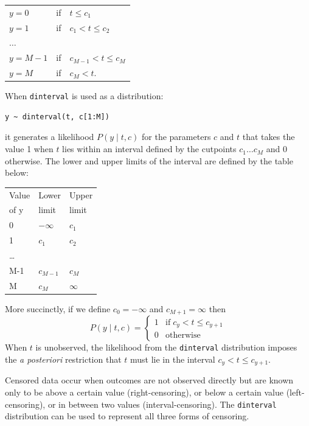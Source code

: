 \documentclass[11pt, a4paper, titlepage]{report}
\begin{document}
\begin{center}
\begin{tabular}{lll}
  \hline
  $y = 0$   & if & $t \leq c_1$\\
  $y = 1$   & if & $c_1 < t \leq c_2$ \\
  $\ldots$  & \\
  $y = M-1$   & if & $c_{M-1} < t \leq c_M$ \\
  $y = M$   & if & $c_M < t$. \\
  \hline
\end{tabular}
\end{center}

When \texttt{dinterval} is used as a distribution:
\begin{verbatim}
y ~ dinterval(t, c[1:M])
\end{verbatim}
it generates a likelihood $P(y \mid t, c)$ for the parameters $c$ and
$t$ that takes the value 1 when $t$ lies within an interval defined by
the cutpoints $c_1 \ldots c_M$ and 0 otherwise. The lower and upper
limits of the interval are defined by the table below:

\begin{center}
\begin{tabular}{lll}
  \hline
  Value   & Lower     & Upper   \\
  of y    & limit     & limit   \\
  \hline
  0       & $-\infty$ & $c_1$     \\
  1       & $c_1$     & $c_2$     \\
  \ldots  &           &         \\
  M-1     & $c_{M-1}$  & $c_M$     \\
  M       & $c_{M}$   & $\infty$ \\
  \hline
\end{tabular}
\end{center}

More succinctly, if we define $c_0 = -\infty$ and $c_{M+1} = \infty$ then
\[
P(y \mid t, c) = \left\{
\begin{array}{cl}
  1 & \mbox{if} \; c_{y} < t \leq c_{y+1} \\
  0 & \mbox{otherwise}
\end{array}
\right.
\]
When $t$ is unobserved, the likelihood from the \texttt{dinterval}
distribution imposes the {\em a posteriori} restriction that $t$ must
lie in the interval $c_{y} < t \leq c_{y+1}$.

Censored data occur when outcomes are not observed directly but are
known only to be above a certain value (right-censoring), or below a
certain value (left-censoring), or in between two values
(interval-censoring). The \texttt{dinterval} distribution can be used
to represent all three forms of censoring.
\end{document}
